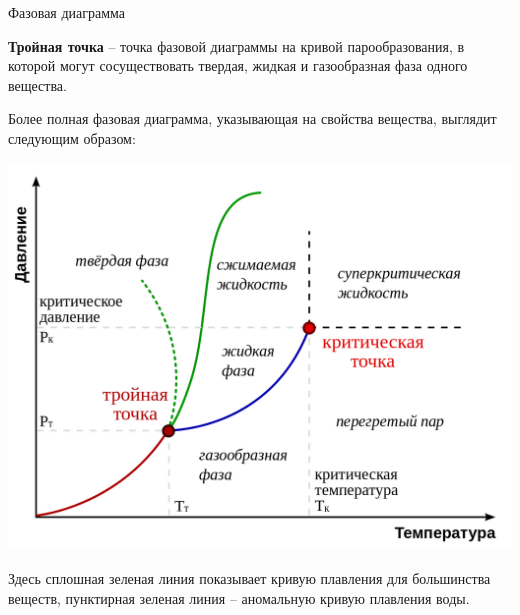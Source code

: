 \documentclass{article}
\newcommand{\definition}[2]{\begin{samepage} \textbf{#1} -- #2. \end{samepage} \par}
\begin{document}
\begin{section}{Фазовая диаграмма}
		\definition{Тройная точка}{точка фазовой диаграммы на кривой парообразования, в которой могут сосуществовать твердая, жидкая и газообразная фаза одного вещества}

		Более полная фазовая диаграмма, указывающая на свойства вещества, выглядит следующим образом:

		\includegraphics[width=\textwidth]{images/phasediagram2.png}

		Здесь сплошная зеленая линия показывает кривую плавления для большинства веществ, пунктирная зеленая линия -- аномальную кривую плавления воды.
	\end{section}
\end{document}
